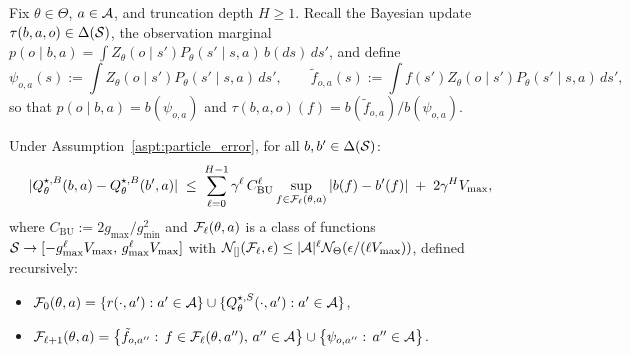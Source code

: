 \begin{lem}\label{lem:Q_lipschitz}
Fix $\theta\in\Theta$, $a\in{\mathcal{A}}$, and truncation depth $H\ge 1$. Recall the Bayesian update $\tau(b,a,o)\in\Delta({\mathcal{S}})$, the observation marginal $p(o\mid b,a)=\int Z_\theta(o\mid s')P_\theta(s'\mid s,a)\,b(ds)\,ds'$, and define
\begin{equation}\label{eq:psi_tilde_f_def}
\psi_{o,a}(s):=\int Z_\theta(o\mid s')P_\theta(s'\mid s,a)\,ds', 
\qquad
\tilde f_{o,a}(s):=\int f(s')Z_\theta(o\mid s')P_\theta(s'\mid s,a)\,ds',
\end{equation}
so that $p(o\mid b,a)=b(\psi_{o,a})$ and $\tau(b,a,o)(f)=b(\tilde f_{o,a})/b(\psi_{o,a})$.

Under Assumption~\ref{aspt:particle_error}, for all $b,b'\in\Delta({\mathcal{S}})$:
\begin{equation}\label{eq:Q_test_decomp}
|Q_\theta^{\star,B}(b,a)-Q_\theta^{\star,B}(b',a)|
\;\le\;
\sum_{\ell=0}^{H-1}\gamma^\ell\,C_{\mathrm{BU}}^\ell\sup_{f\in{\mathcal{F}}_\ell(\theta,a)}|b(f)-b'(f)|
\;+\;2\gamma^H V_{\max},
\end{equation}
where $C_{\mathrm{BU}}:=2g_{\max}/g_{\min}^2$ and ${\mathcal{F}}_\ell(\theta,a)$ is a class of functions ${\mathcal{S}}\to[-g_{\max}^\ell V_{\max},\,g_{\max}^\ell V_{\max}]$ with ${\mathcal{N}}_{[]}({\mathcal{F}}_\ell,\epsilon)\le|{\mathcal{A}}|^\ell{\mathcal{N}}_\Theta(\epsilon/(\ell V_{\max}))$, defined recursively:
\begin{itemize}
\item ${\mathcal{F}}_0(\theta,a)=\{r(\cdot,a'):a'\in{\mathcal{A}}\}\cup\{Q_\theta^{\star,S}(\cdot,a'):a'\in{\mathcal{A}}\}$,
\item ${\mathcal{F}}_{\ell+1}(\theta,a)=\bigl\{\tilde f_{o,a''}:\,f\in{\mathcal{F}}_\ell(\theta,a''),\,a''\in{\mathcal{A}}\bigr\}\cup\bigl\{\psi_{o,a''}:\,a''\in{\mathcal{A}}\bigr\}$.
\end{itemize}
\end{lem}

